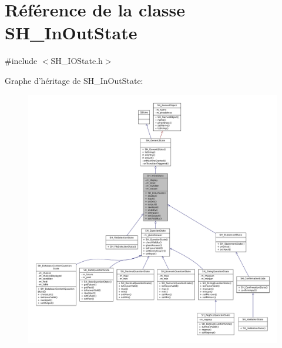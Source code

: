 \hypertarget{classSH__InOutState}{\section{Référence de la classe S\-H\-\_\-\-In\-Out\-State}
\label{classSH__InOutState}
}


{\ttfamily \#include $<$S\-H\-\_\-\-I\-O\-State.\-h$>$}



Graphe d'héritage de S\-H\-\_\-\-In\-Out\-State\-:\nopagebreak
\begin{figure}[H]
\begin{center}
\leavevmode
\includegraphics[width=350pt]{classSH__InOutState__inherit__graph}
\end{center}
\end{figure}


